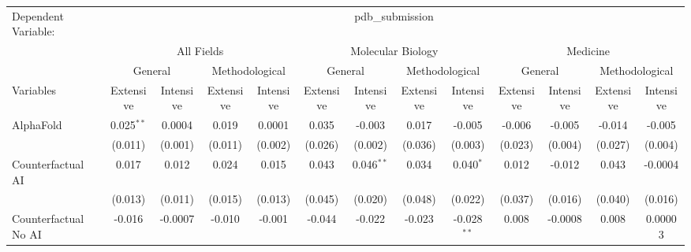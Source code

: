 \begingroup
\centering
\begin{tabular}{lcccccccccccc}
   \tabularnewline \midrule \midrule
   Dependent Variable: & \multicolumn{12}{c}{pdb\_submission}\\
 & \multicolumn{4}{c}{All Fields} & \multicolumn{4}{c}{Molecular Biology} & \multicolumn{4}{c}{Medicine} \\
\cmidrule(lr){2-5} \cmidrule(lr){6-9} \cmidrule(lr){10-13}
 & \multicolumn{2}{c}{General} & \multicolumn{2}{c}{Methodological} & \multicolumn{2}{c}{General} & \multicolumn{2}{c}{Methodological} & \multicolumn{2}{c}{General} & \multicolumn{2}{c}{Methodological} \\
\cmidrule(lr){2-3} \cmidrule(lr){4-5} \cmidrule(lr){6-7} \cmidrule(lr){8-9} \cmidrule(lr){10-11} \cmidrule(lr){12-13}
Variables & \multicolumn{1}{c}{Extensive} & \multicolumn{1}{c}{Intensive} & \multicolumn{1}{c}{Extensive} & \multicolumn{1}{c}{Intensive} & \multicolumn{1}{c}{Extensive} & \multicolumn{1}{c}{Intensive} & \multicolumn{1}{c}{Extensive} & \multicolumn{1}{c}{Intensive} & \multicolumn{1}{c}{Extensive} & \multicolumn{1}{c}{Intensive} & \multicolumn{1}{c}{Extensive} & \multicolumn{1}{c}{Intensive} \\
\cmidrule(lr){1-1}\cmidrule(lr){2-2} \cmidrule(lr){3-3} \cmidrule(lr){4-4} \cmidrule(lr){5-5} \cmidrule(lr){6-6} \cmidrule(lr){7-7} \cmidrule(lr){8-8} \cmidrule(lr){9-9} \cmidrule(lr){10-10} \cmidrule(lr){11-11} \cmidrule(lr){12-12} \cmidrule(lr){13-13}
   AlphaFold                                & 0.025$^{**}$ & 0.0004   & 0.019   & 0.0001   & 0.035   & -0.003       & 0.017   & -0.005        & -0.006  & -0.005       & -0.014  & -0.005\\   
                                            & (0.011)      & (0.001)  & (0.011) & (0.002)  & (0.026) & (0.002)      & (0.036) & (0.003)       & (0.023) & (0.004)      & (0.027) & (0.004)\\   
   Counterfactual AI                        & 0.017        & 0.012    & 0.024   & 0.015    & 0.043   & 0.046$^{**}$ & 0.034   & 0.040$^{*}$   & 0.012   & -0.012       & 0.043   & -0.0004\\   
                                            & (0.013)      & (0.011)  & (0.015) & (0.013)  & (0.045) & (0.020)      & (0.048) & (0.022)       & (0.037) & (0.016)      & (0.040) & (0.016)\\   
   Counterfactual No AI                     & -0.016       & -0.0007  & -0.010  & -0.001   & -0.044  & -0.022       & -0.023  & -0.028$^{**}$ & 0.008   & -0.0008      & 0.008   & 0.00003\\   

\end{tabular}

